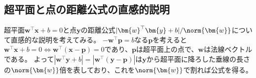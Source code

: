         \subsection{超平面と点の距離公式の直感的説明}
            超平面$\bm{w}^\top\bm{x}+b=0$と点$\bm{y}$の距離公式$|\bm{w}^\top\bm{y}+b|/\norm{\bm{w}}$について直感的な説明を考えてみる。
            $-\bm{w}^\top\bm{p} = b$なる$\bm{p}$を考えると$\bm{w}^\top\bm{x}+b=0 \iff \bm{w}^\top(\bm{x}-\bm{p})=0$であり、$\bm{p}$は超平面上の点で、$\bm{w}$は法線ベクトルである。
            よって$|\bm{w}^\top\bm{y}+b| = |\bm{w}^\top(\bm{y}-\bm{p})|$は$\bm{y}$から超平面に降ろした垂線の長さの$\norm{\bm{w}}$倍を表しており、これを$\norm{\bm{w}}$で割れば公式を得る。